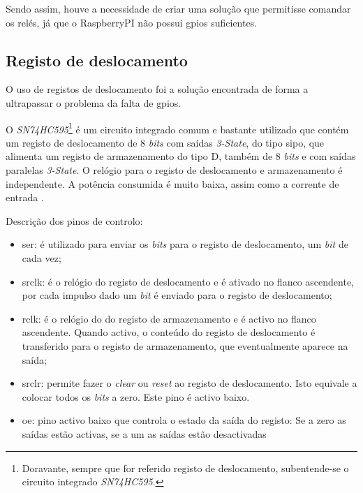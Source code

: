 Sendo assim, houve a necessidade de criar uma solução que permitisse comandar os relés, já que o \gls{RaspberryPI} não possui \acrshort{gpio}s suficientes.

\subsection{Registo de deslocamento}
\label{sec:registodeslocamento}
O uso de registos de deslocamento foi a solução encontrada de forma a ultrapassar o problema da falta de \acrshort{gpio}s.

O \textit{SN74HC595}\footnote{Doravante, sempre que for referido registo de deslocamento, subentende-se o circuito integrado \textit{SN74HC595}.} é um circuito integrado comum e bastante utilizado que contém um registo de deslocamento de 8 \textit{bits} com saídas \textit{3-State}, do tipo \acrfull{sipo}, que alimenta um registo de armazenamento do tipo D, também de 8 \textit{bits} e com saídas paralelas \textit{3-State}. O relógio para o registo de deslocamento e armazenamento é independente. A potência consumida é muito baixa, assim como a corrente de entrada \cite{SN74HC595}.

Descrição dos pinos de controlo:
\begin{itemize}
    \item \acrfull{ser}: é utilizado para enviar os \textit{bits} para o registo de deslocamento, um \textit{bit} de cada vez;

    \item \acrfull{srclk}: é o relógio do registo de deslocamento e é ativado no flanco ascendente, por cada impulso dado um \textit{bit} é enviado para o registo de deslocamento;

    \item \acrfull{rclk}: é o relógio do do registo de armazenamento e é activo no flanco ascendente. Quando activo, o conteúdo do registo de deslocamento é transferido para o registo de armazenamento, que eventualmente aparece na saída;

    \item \acrfull{srclr}: permite fazer o \textit{clear} ou \textit{reset} ao registo de deslocamento. Isto equivale a colocar todos os \textit{bits} a zero. Este pino é activo baixo.

    \item \acrfull{oe}: pino activo baixo que controla o estado da saída do registo: Se a zero as saídas estão activas, se a um as saídas estão desactivadas
\end{itemize}

